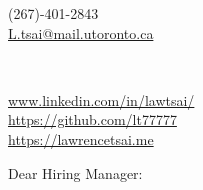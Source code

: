 \documentclass[11pt,a4]{article}
\begin{document}
\begin{center}
    \begin{minipage}[b]{0.24\textwidth}
            \large (267)-401-2843 \\
            \large \href{mailto:L.tsai@mail.utoronto.ca}{L.tsai@mail.utoronto.ca} 
    \end{minipage}%
    \begin{minipage}[b]{0.5\textwidth}
             \\ %
            \vspace{0.1cm}
            {\color{UI_blue} \Large{}}
    \end{minipage}%
    \begin{minipage}[b]{0.33\textwidth}
            \flushright \small
            {\href{www.linkedin.com/in/lawtsai/}{www.linkedin.com/in/lawtsai/} } \\
            \href{https://github.com/lt77777}{https://github.com/lt77777} \\
            \href{https://lawrencetsai.me}
            {https://lawrencetsai.me}
    \end{minipage}   
    
\vspace{-0.15cm} 
{\color{UI_blue} \hrulefill}
\end{center}

\justify
\setlength{\parindent}{0pt}
\setlength{\parskip}{12pt}
\vspace{0.2cm}




Dear Hiring Manager:
\end{document}

